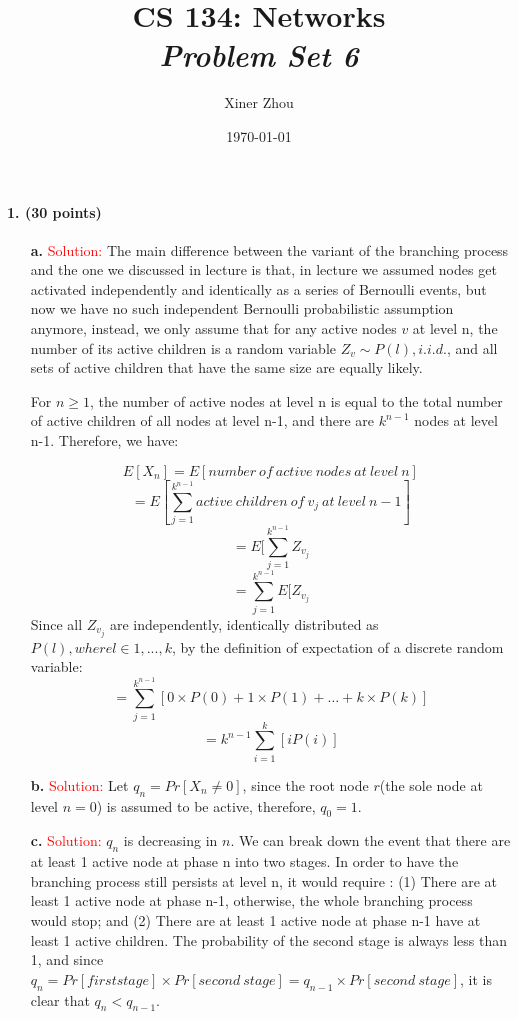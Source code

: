 \documentclass[11pt]{article} %
\title{CS 134: Networks \\ \emph{Problem Set 6}}
\author{Xiner Zhou}
\date{\today} %
\begin{document}
 
\maketitle
  

\paragraph{1. (30 points)}  

\begin{itemize}

        \item[\textbf{a.}]   
\textcolor{red}{Solution:}
The main difference between the variant of the branching process and the one we discussed in lecture is that, in lecture we assumed nodes get activated independently and identically as a series of Bernoulli events, but now we have no such independent Bernoulli probabilistic assumption anymore, instead, we only assume that for any active nodes $v$ at level n, the number of its active children is a random variable $Z_v \sim P(l), i.i.d.$, and all sets of active children that have the same size are equally likely.

For $n \ge 1$, the number of active nodes at level n is equal to the total number of active children of all nodes at level n-1, and there are $k^{n-1}$ nodes at level n-1. Therefore, we have:

$$ E[X_n]=E[number \  of  \  active  \  nodes  \  at  \   level  \  n]$$
$$=E[\sum_{j=1}^{k^{n-1}} active  \  children  \  of  \   v_j  \  at  \  level  \  n-1]$$
$$=E[\sum_{j=1}^{k^{n-1}} Z_{v_j}$$
$$=\sum_{j=1}^{k^{n-1}} E[Z_{v_j}$$
Since all $Z_{v_j}$ are independently, identically distributed as $P(l), where l \in {1,...,k}$, by the definition of expectation of a discrete random variable:
$$=\sum_{j=1}^{k^{n-1}} [0\times P(0)+1\times P(1) +\dots + k\times P(k)]$$
$$=k^{n-1}\sum_{i=1}^{k} [i P(i)]$$

        \item[\textbf{b.}]  
\textcolor{red}{Solution:}
Let $q_n=Pr[X_n \ne 0]$, since the root node $r$(the sole node at level $n=0$) is assumed to be active, therefore, $q_0=1$.

        \item[\textbf{c.}]  
\textcolor{red}{Solution:}
$q_n$ is decreasing in $n$. We can break down the event that there are at least 1 active node at phase n into two stages. In order to have the branching process still persists at level n, it would require : (1) There are at least 1 active node at phase n-1, otherwise, the whole branching process would stop; and (2) There are at least 1 active node at phase n-1 have at least 1 active children. The probability of the second stage is always less than 1, and since $q_n= Pr[first stage] \times Pr[second \ stage]=q_{n-1} \times Pr[second \  stage]$, it is clear that $q_n<q_{n-1}$.


\end{itemize}
\end{document}
